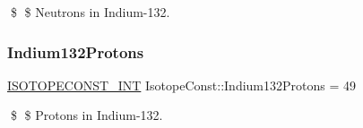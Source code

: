 \$ \$ Neutrons in Indium-\/132. \mbox{\label{group___isotope_const-_indium-_in132_ga8c0aacb2d4a67232091dbfc19502e02d}} 
\subsubsection{\texorpdfstring{Indium132\+Protons}{Indium132Protons}}
{\footnotesize\ttfamily \mbox{\hyperlink{group___isotope_const-_macros_ga5f18360b3e99483a35c32d789e62621c}{I\+S\+O\+T\+O\+P\+E\+C\+O\+N\+S\+T\+\_\+\+I\+NT}} Isotope\+Const\+::\+Indium132\+Protons = 49}

\$ \$ Protons in Indium-\/132. 